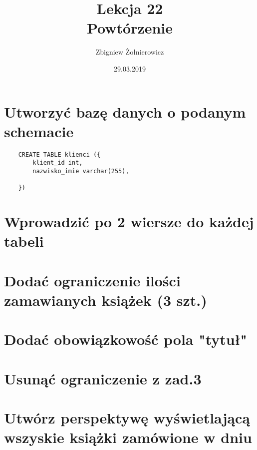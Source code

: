 \documentclass[a4paper]{article}
\begin{document}
\title{{\huge Lekcja 22} \\
{\large Powtórzenie}}
\author{Zbigniew Żołnierowicz}
\date{29.03.2019}
\maketitle

\section{Utworzyć bazę danych o podanym schemacie}

\begin{verbatim}
    CREATE TABLE klienci ({
        klient_id int,
        nazwisko_imie varchar(255),

    })
\end{verbatim}

\section{Wprowadzić po 2 wiersze do każdej tabeli}

\section{Dodać ograniczenie ilości zamawianych książek (3 szt.)}

\section{Dodać obowiązkowość pola "tytuł"}

\section{Usunąć ograniczenie z zad.\@ 3}

\section{Utwórz perspektywę wyświetlającą wszyskie książki zamówione w dniu}
\end{document}
